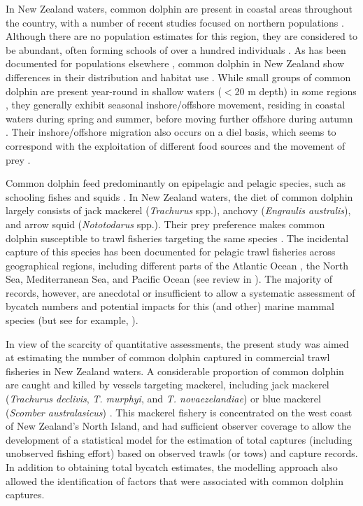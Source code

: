 \documentclass[10pt]{article}
\begin{document}
In New Zealand waters, common dolphin are present in coastal areas throughout the country, with a number of recent studies focused on northern populations \cite{brager_distribution_1998, neumann_photo_2002, meynier_stomach_2008, stockin_status_2009}.  
Although there are no population estimates for this region, they are considered to be abundant, often forming schools of over a hundred individuals \cite{stockin_factors_2008}.  As has been documented for populations elsewhere \cite{forney_distribution_2006}, common dolphin in New Zealand show differences in their distribution and habitat use \cite{stockin_factors_2008}.  
While small groups of common dolphin are present year-round in shallow waters ($<$20 m depth) in some regions \cite{stockin_factors_2008}, they generally exhibit seasonal inshore/offshore movement, residing in coastal waters during spring and summer, before moving further offshore during autumn \cite{neumann_seasonal_2001}. Their inshore/offshore migration also occurs on a diel basis, which seems to correspond with the exploitation of different food sources and the movement of prey \cite{meynier_stomach_2008}.  

Common dolphin feed predominantly on epipelagic and pelagic species, such as schooling fishes and squids \cite{ohizumi_stomach_1998, pusineri_food_2007, rossman_estimated_2010}.   In New Zealand waters, the diet of common dolphin largely consists of jack mackerel (\emph{Trachurus} spp.), anchovy (\emph{Engraulis australis}), and arrow squid  (\emph{Nototodarus}
spp.)\cite{meynier_stomach_2008}.  Their prey preference makes common dolphin susceptible to trawl fisheries targeting the same species  \cite{morizur_incidental_1999}.  The incidental capture of this species has been documented for pelagic trawl fisheries across geographical regions, including different parts of the Atlantic Ocean \cite{waring_incidental_1990, morizur_incidental_1999}, the North Sea, Mediterranean Sea, and Pacific Ocean (see review in \cite{fertl_cetacean_1997}).  The majority of records, however, are anecdotal or insufficient to allow a systematic assessment of bycatch numbers and potential impacts for this (and other) marine mammal species (but see for example, \cite{morizur_incidental_1999}).

In view of the scarcity of quantitative assessments, the present study was aimed at estimating the number of common dolphin captured in commercial trawl fisheries in New Zealand waters.
A considerable proportion of common dolphin are caught and killed by vessels targeting mackerel, including jack mackerel (\emph{Trachurus declivis}, \emph{T.  murphyi}, and \emph{T. novaezelandiae}) or blue mackerel (\emph{Scomber australasicus}) \cite{stockin_status_2009}. This mackerel fishery is concentrated on the west coast of New Zealand's North Island, and had sufficient observer coverage to allow the development of a statistical model for the estimation of total captures (including unobserved fishing effort) based on observed trawls (or tows) and capture records.  In addition to obtaining total bycatch estimates, the modelling approach also allowed the identification of factors that were associated with common dolphin captures.
 
\end{document}
